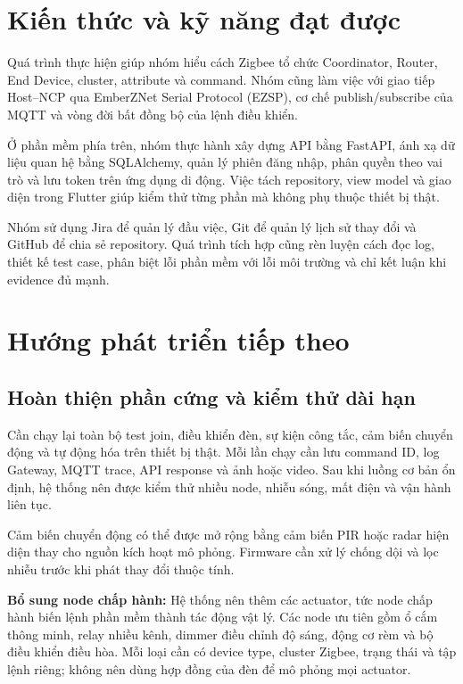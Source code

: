 \section{Kiến thức và kỹ năng đạt được}
\label{sec:ch6-skills-learned}

Quá trình thực hiện giúp nhóm hiểu cách Zigbee tổ chức Coordinator, Router, End Device, cluster, attribute và command. Nhóm cũng làm việc với giao tiếp Host--NCP qua EmberZNet Serial Protocol (EZSP), cơ chế publish/subscribe của MQTT và vòng đời bất đồng bộ của lệnh điều khiển.

Ở phần mềm phía trên, nhóm thực hành xây dựng API bằng FastAPI, ánh xạ dữ liệu quan hệ bằng SQLAlchemy, quản lý phiên đăng nhập, phân quyền theo vai trò và lưu token trên ứng dụng di động. Việc tách repository, view model và giao diện trong Flutter giúp kiểm thử từng phần mà không phụ thuộc thiết bị thật.

Nhóm sử dụng Jira để quản lý đầu việc, Git để quản lý lịch sử thay đổi và GitHub để chia sẻ repository. Quá trình tích hợp cũng rèn luyện cách đọc log, thiết kế test case, phân biệt lỗi phần mềm với lỗi môi trường và chỉ kết luận khi evidence đủ mạnh.

\section{Hướng phát triển tiếp theo}
\label{sec:ch6-future-work}

\subsection{Hoàn thiện phần cứng và kiểm thử dài hạn}
\label{sec:ch6-fw-future}

Cần chạy lại toàn bộ test join, điều khiển đèn, sự kiện công tắc, cảm biến chuyển động và tự động hóa trên thiết bị thật. Mỗi lần chạy cần lưu command ID, log Gateway, MQTT trace, API response và ảnh hoặc video. Sau khi luồng cơ bản ổn định, hệ thống nên được kiểm thử nhiều node, nhiễu sóng, mất điện và vận hành liên tục.

Cảm biến chuyển động có thể được mở rộng bằng cảm biến PIR hoặc radar hiện diện thay cho nguồn kích hoạt mô phỏng. Firmware cần xử lý chống dội và lọc nhiễu trước khi phát thay đổi thuộc tính.

\textbf{Bổ sung node chấp hành:} Hệ thống nên thêm các actuator, tức node chấp hành biến lệnh phần mềm thành tác động vật lý. Các node ưu tiên gồm ổ cắm thông minh, relay nhiều kênh, dimmer điều chỉnh độ sáng, động cơ rèm và bộ điều khiển điều hòa. Mỗi loại cần có device type, cluster Zigbee, trạng thái và tập lệnh riêng; không nên dùng hợp đồng của đèn để mô phỏng mọi actuator.

